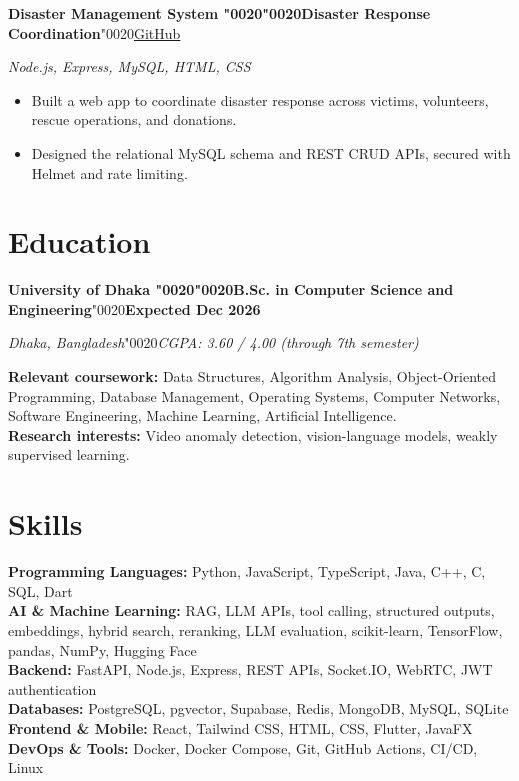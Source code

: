 \documentclass[10pt,a4paper]{article}
\newcommand{\realspace}{\XeTeXglyph\XeTeXcharglyph"0020\relax}
\newcommand{\headingrow}[2]{\textbf{#1}\realspace\hfill\textbf{#2}\par}
\newcommand{\subrow}[2]{\textit{#1}\realspace\hfill\textit{#2}\par\vspace{1pt}}
\newcommand{\psep}{\realspace\textbar\realspace}
\newcommand{\projectrow}[2]{\Needspace{4\baselineskip}\textbf{#1}\realspace\hfill #2\par}
\newcommand{\techrow}[1]{\textit{#1}\par\vspace{1pt}}
\begin{document}
\projectrow{Disaster Management System \psep Disaster Response Coordination}{\href{https://github.com/shahriarkabir280/DisasterManagement}{GitHub}}
\techrow{Node.js, Express, MySQL, HTML, CSS}
\begin{itemize}
  \item Built a web app to coordinate disaster response across victims, volunteers, rescue operations, and donations.
  \item Designed the relational MySQL schema and REST CRUD APIs, secured with Helmet and rate limiting.
\end{itemize}

\section*{Education}
\headingrow{University of Dhaka \psep B.Sc. in Computer Science and Engineering}{Expected Dec 2026}
\subrow{Dhaka, Bangladesh}{CGPA: 3.60 / 4.00 (through 7th semester)}
\textbf{Relevant coursework:} Data Structures, Algorithm Analysis, Object-Oriented Programming, Database Management,
Operating Systems, Computer Networks, Software Engineering, Machine Learning, Artificial Intelligence.\\
\textbf{Research interests:} Video anomaly detection, vision-language models, weakly supervised learning.

\section*{Skills}
\textbf{Programming Languages:} Python, JavaScript, TypeScript, Java, C++, C, SQL, Dart\\
\textbf{AI \& Machine Learning:} RAG, LLM APIs, tool calling, structured outputs, embeddings, hybrid search, reranking, LLM evaluation, scikit-learn, TensorFlow, pandas, NumPy, Hugging Face\\
\textbf{Backend:} FastAPI, Node.js, Express, REST APIs, Socket.IO, WebRTC, JWT authentication\\
\textbf{Databases:} PostgreSQL, pgvector, Supabase, Redis, MongoDB, MySQL, SQLite\\
\textbf{Frontend \& Mobile:} React, Tailwind CSS, HTML, CSS, Flutter, JavaFX\\
\textbf{DevOps \& Tools:} Docker, Docker Compose, Git, GitHub Actions, CI/CD, Linux

\end{document}
